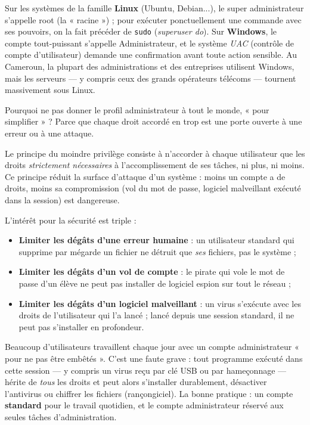 \documentclass[11pt]{article}
\newcommand{\cle}[1]{{\popxbold\color{popdark}#1}}
\newcounter{popsec}
\newcounter{popsub}
\newcommand{\courssub}[1]{%
  \stepcounter{popsub}%
  \par\vspace{9pt}\noindent{\popxbold\fontsize{11.5}{13}\selectfont\color{popink}{\color{poporange}\thepopsec.\thepopsub}\hspace{6pt}#1}\par\nopagebreak\vspace{4pt}
}
\begin{document}
\begin{savaistu}
Sur les systèmes de la famille \textbf{Linux} (Ubuntu, Debian...), le super administrateur s'appelle \cle{root} (la « racine ») ; pour exécuter ponctuellement une commande avec ses pouvoirs, on la fait précéder de \texttt{sudo} (\emph{superuser do}). Sur \textbf{Windows}, le compte tout-puissant s'appelle \cle{Administrateur}, et le système \emph{UAC} (contrôle de compte d'utilisateur) demande une confirmation avant toute action sensible. Au Cameroun, la plupart des administrations et des entreprises utilisent Windows, mais les serveurs — y compris ceux des grands opérateurs télécoms — tournent massivement sous Linux.
\end{savaistu}

\courssub{Le principe du moindre privilège}

Pourquoi ne pas donner le profil administrateur à tout le monde, « pour simplifier » ? Parce que chaque droit accordé en trop est une porte ouverte à une erreur ou à une attaque.

\begin{propriete}
Le \cle{principe du moindre privilège} consiste à n'accorder à chaque utilisateur que les droits \emph{strictement nécessaires} à l'accomplissement de ses tâches, ni plus, ni moins. Ce principe réduit la \cle{surface d'attaque} d'un système : moins un compte a de droits, moins sa compromission (vol du mot de passe, logiciel malveillant exécuté dans la session) est dangereuse.
\end{propriete}

L'intérêt pour la sécurité est triple :
\begin{itemize}
  \item \textbf{Limiter les dégâts d'une erreur humaine} : un utilisateur standard qui supprime par mégarde un fichier ne détruit que \emph{ses} fichiers, pas le système ;
  \item \textbf{Limiter les dégâts d'un vol de compte} : le pirate qui vole le mot de passe d'un élève ne peut pas installer de logiciel espion sur tout le réseau ;
  \item \textbf{Limiter les dégâts d'un logiciel malveillant} : un virus s'exécute avec les droits de l'utilisateur qui l'a lancé ; lancé depuis une session standard, il ne peut pas s'installer en profondeur.
\end{itemize}

\begin{attention}
Beaucoup d'utilisateurs travaillent chaque jour avec un compte administrateur « pour ne pas être embêtés ». C'est une faute grave : tout programme exécuté dans cette session — y compris un virus reçu par clé USB ou par hameçonnage — hérite de \emph{tous} les droits et peut alors s'installer durablement, désactiver l'antivirus ou chiffrer les fichiers (rançongiciel). La bonne pratique : un compte \textbf{standard} pour le travail quotidien, et le compte administrateur réservé aux seules tâches d'administration.
\end{attention}
\end{document}
